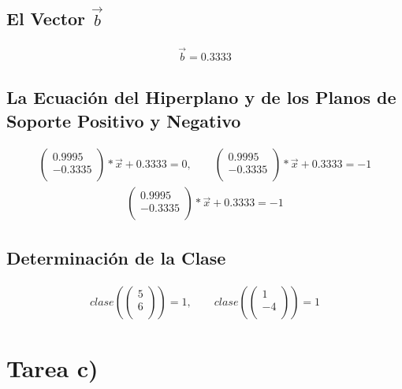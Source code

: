 \documentclass[fleqn]{llncs}
\begin{document}
\subsection{El Vector $\overrightarrow{b}$}
\begin{align*}
	\overrightarrow{b} = 0.3333
\end{align*}

\subsection{La Ecuación del Hiperplano y de los Planos de Soporte Positivo y Negativo}
\begin{align*}
	\begin{pmatrix}
		0.9995 \\
		-0.3335 \\
	\end{pmatrix} * \overrightarrow{x} + 0.3333 = 0,
	\qquad
	\begin{pmatrix}
		0.9995 \\
		-0.3335 \\
	\end{pmatrix} * \overrightarrow{x} + 0.3333 = -1
\end{align*}
\begin{align*}
	\begin{pmatrix}
		0.9995 \\
		-0.3335 \\
	\end{pmatrix} * \overrightarrow{x} + 0.3333 = -1
\end{align*}

\subsection{Determinación de la Clase}
\begin{align*}
	clase \left(
	\begin{pmatrix}
		5 \\
		6 \\
	\end{pmatrix} \right) = 1,
	\qquad
	clase \left(
	\begin{pmatrix}
		1 \\
		-4 \\
	\end{pmatrix} \right) = 1
\end{align*}

\newpage

\section{Tarea c)}
\end{document}
